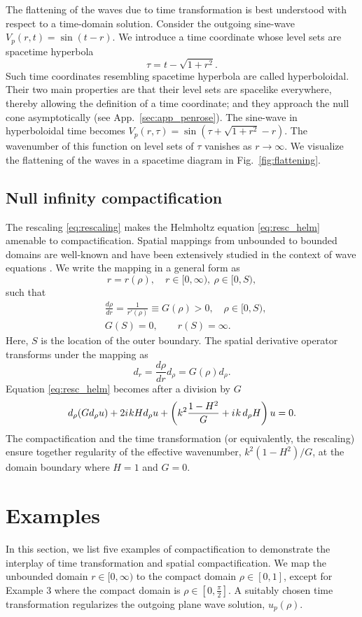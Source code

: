 \documentclass[draft,onefignum,onetabnum]{siamart190516}
\newcommand{\be}{\begin{equation}}
\newcommand{\ee}{\end{equation}}
\newcommand{\iu}{{i\mkern1mu}}
\begin{document}
The flattening of the waves due to time transformation is best understood with respect to a time-domain solution. Consider the outgoing sine-wave $V_p(r,t) = \sin(t-r)$. We introduce a time coordinate whose level sets are spacetime hyperbola
\be\label{eq:hyperbola} \tau = t - \sqrt{1+r^2}.\ee
Such time coordinates resembling spacetime hyperbola are called hyperboloidal. Their two main properties are that their level sets are spacelike everywhere, thereby allowing the definition of a time coordinate; and they approach the null cone asymptotically (see App.~\ref{sec:app_penrose}). The sine-wave in hyperboloidal time becomes $V_p(r,\tau) = \sin\left(\tau + \sqrt{1+r^2} - r\right)$. The wavenumber of this function on level sets of $\tau$ vanishes as $r\to\infty$. We visualize the flattening of the waves in a spacetime diagram in Fig.~\ref{fig:flattening}.

\subsection{Null infinity compactification}
The rescaling \eqref{eq:rescaling} makes the Helmholtz equation \eqref{eq:resc_helm} amenable to compactification. Spatial mappings from unbounded to bounded domains are well-known and have been extensively studied in the context of wave equations \cite{GroschOrszag77, boyd1982optimization, shen2009some, wang2017perfect}. We write the mapping in a general form as
\[ r = r(\rho), \quad r\in[0,\infty),\ \rho\in[0,S), \]
such that
\begin{align*}
	 & \frac{d\rho}{dr} = \frac{1}{r'(\rho)} \equiv G(\rho) > 0, \quad \rho\in [0,S), \\
	 & G(S)      = 0, \qquad r(S) = \infty.
\end{align*}
Here, $S$ is the location of the outer boundary. The spatial derivative operator transforms under the mapping as
\[ d_r = \frac{d\rho}{dr} d_\rho = G(\rho) d_\rho.  \]
Equation \eqref{eq:resc_helm} becomes after a division by $G$ 
\be\label{eq:trafo_helm}
d_\rho (G d_\rho u) + 2 \iu k H d_\rho u + \left(k^2 \frac{1-H^2}{G} + \iu k \, d_\rho H \right) u = 0.
\ee
The compactification and the time transformation (or equivalently, the rescaling) ensure together regularity of the effective wavenumber, $k^2 (1-H^2)/G$, at the domain boundary where $H=1$ and $G=0$. 

\section{Examples}
In this section, we list five examples of compactification to demonstrate the interplay of time transformation and spatial compactification. We map the unbounded domain $r\in[0,\infty)$ to the compact domain $\rho\in[0,1]$, except for Example 3 where the compact domain is $\rho\in[0,\frac{\pi}{2}]$. A suitably chosen time transformation regularizes the outgoing plane wave solution, $u_p(\rho)$.
\end{document}
